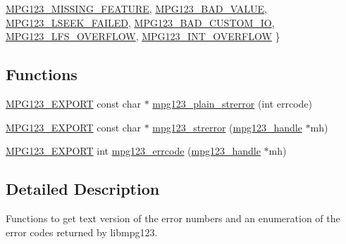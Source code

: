 \begin{DoxyCompactItemize}
\mbox{\hyperlink{group__mpg123__error_ggac50432012aeaf7c23014de3198dfa5fdaeede1c7688467a75161c766ecf479ce8}{M\+P\+G123\+\_\+\+M\+I\+S\+S\+I\+N\+G\+\_\+\+F\+E\+A\+T\+U\+RE}}, 
\mbox{\hyperlink{group__mpg123__error_ggac50432012aeaf7c23014de3198dfa5fdaebc536f5fffaa1abe7243434cf2d353e}{M\+P\+G123\+\_\+\+B\+A\+D\+\_\+\+V\+A\+L\+UE}}, 
\newline
\mbox{\hyperlink{group__mpg123__error_ggac50432012aeaf7c23014de3198dfa5fda102bd78ff1fad6cce594e22ea6fb0698}{M\+P\+G123\+\_\+\+L\+S\+E\+E\+K\+\_\+\+F\+A\+I\+L\+ED}}, 
\mbox{\hyperlink{group__mpg123__error_ggac50432012aeaf7c23014de3198dfa5fda9968b3ba91db9dd166fa8421572bda52}{M\+P\+G123\+\_\+\+B\+A\+D\+\_\+\+C\+U\+S\+T\+O\+M\+\_\+\+IO}}, 
\mbox{\hyperlink{group__mpg123__error_ggac50432012aeaf7c23014de3198dfa5fda7ecc133213daa350d801a9e1dc3028e3}{M\+P\+G123\+\_\+\+L\+F\+S\+\_\+\+O\+V\+E\+R\+F\+L\+OW}}, 
\mbox{\hyperlink{group__mpg123__error_ggac50432012aeaf7c23014de3198dfa5fda29cadbffa0da2fc28d1d83e59211b86e}{M\+P\+G123\+\_\+\+I\+N\+T\+\_\+\+O\+V\+E\+R\+F\+L\+OW}}
 \}
\end{DoxyCompactItemize}
\subsection*{Functions}
\begin{DoxyCompactItemize}
\item 
\mbox{\hyperlink{mpg123_8h_a2ba98cfba3f760879df70e755b2a61cc}{M\+P\+G123\+\_\+\+E\+X\+P\+O\+RT}} const char $\ast$ \mbox{\hyperlink{group__mpg123__error_gacf2c837729218ae3681e3fdb03cda529}{mpg123\+\_\+plain\+\_\+strerror}} (int errcode)
\item 
\mbox{\hyperlink{mpg123_8h_a2ba98cfba3f760879df70e755b2a61cc}{M\+P\+G123\+\_\+\+E\+X\+P\+O\+RT}} const char $\ast$ \mbox{\hyperlink{group__mpg123__error_ga161acf171646d7ffce09446404cb0c21}{mpg123\+\_\+strerror}} (\mbox{\hyperlink{group__mpg123__init_ga6728e2839a395f3a07d4514da659faca}{mpg123\+\_\+handle}} $\ast$mh)
\item 
\mbox{\hyperlink{mpg123_8h_a2ba98cfba3f760879df70e755b2a61cc}{M\+P\+G123\+\_\+\+E\+X\+P\+O\+RT}} int \mbox{\hyperlink{group__mpg123__error_ga3fcb62b39c7ee3884b163aee0433df04}{mpg123\+\_\+errcode}} (\mbox{\hyperlink{group__mpg123__init_ga6728e2839a395f3a07d4514da659faca}{mpg123\+\_\+handle}} $\ast$mh)
\end{DoxyCompactItemize}


\subsection{Detailed Description}
Functions to get text version of the error numbers and an enumeration of the error codes returned by libmpg123.

